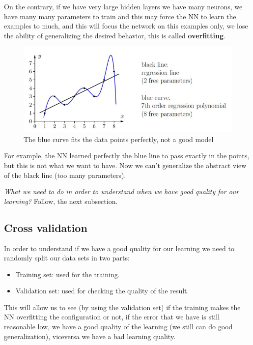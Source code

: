 \documentclass{article}
\begin{document}
On the contrary, if we have very large hidden layers we have many neurons, we have many many parameters to train and this may force the
NN to learn the examples to much, and this will focus the network on this examples only, we lose the ability of
generalizing the desired behavior, this is called \textbf{overfitting}.
\begin{figure}[H]
    \centering
    \includegraphics[scale=0.6]{images/overfitting.png}
    \caption{The blue curve fits the data points perfectly, not a good model}
\end{figure}
For example, the NN learned perfectly the blue line to pass exactly in the points, but this is not what we
want to have. Now we can't generalize the abstract view of the black line (too many parameters).

\textit{What we need to do in order to understand when we have good quality for our learning?} Follow, the
next subsection.
\subsection{Cross validation}
In order to understand if we have a good quality for our learning we need to
randomly split our data sets in two parts:
\begin{itemize}
    \item Training set: used for the training.
    \item Validation set: used for checking the quality of the result.
\end{itemize}
This will allow us to see (by using the validation set) if the training makes the NN overfitting the configuration or
not, if the error that we have is still reasonable low, we have a good quality of the learning
(we still can do good generalization), viceversa we have a bad learning quality.
\end{document}
